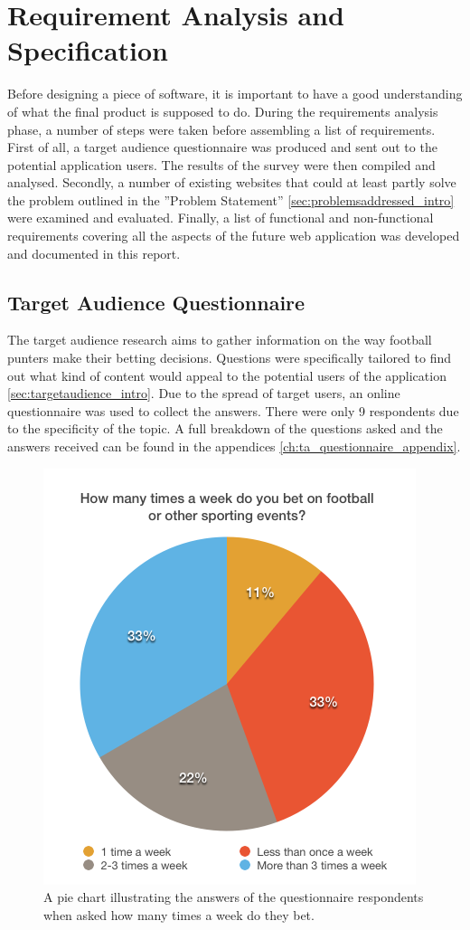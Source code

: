 \chapter{Requirement Analysis and Specification}
\label{ch:requirementanalysis}
Before designing a piece of software, it is important to have a good understanding of what the final product is supposed to do. During the requirements analysis phase, a number of steps were taken before assembling a list of requirements. First of all, a target audience questionnaire was produced and sent out to the potential application users. The results of the survey were then compiled and analysed. Secondly, a number of existing websites that could at least partly solve the problem outlined in the ”Problem Statement” \ref{sec:problemsaddressed_intro}  were examined and evaluated. Finally, a list of functional and non-functional requirements covering all the aspects of the future web application was developed and documented in this report.

\section{Target Audience Questionnaire}
\label{sec:targetaudiencequestionnaire_req}
The target audience research aims to gather information on the way football punters make their betting decisions. Questions were specifically tailored to find out what kind of content would appeal to the potential users of the application \ref{sec:targetaudience_intro}. Due to the spread of target users, an online questionnaire was used to collect the answers. There were only 9 respondents due to the specificity of the topic. A full breakdown of the questions asked and the answers received can be found in the appendices \ref{ch:ta_questionnaire_appendix}.

\begin{figure}[H]
	\begin{center}
		\includegraphics[width=.50\columnwidth]{req/images/howMuchDoYouBet.png}
		\caption{A pie chart illustrating the answers of the questionnaire respondents when asked how many times a week do they bet.} \label{fig:using:howmuchdoyoubet}
	\end{center}
\end{figure}


